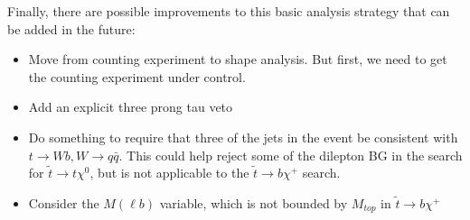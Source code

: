 Finally, there are possible improvements to this basic analysis strategy that can be added in the future:
\begin{itemize}
\item Move from counting experiment to shape analysis.  But first, we need to get the counting
experiment under control.
\item Add an explicit three prong tau veto
\item Do something to require that three of the jets in the event be consistent with $t \to Wb, W \to q\bar{q}$.
This could help reject some of the dilepton BG in the search for $\widetilde{t} \to t \chi^0$, 
but is not applicable to the $\widetilde{t} \to b \chi^+$ search.
\item Consider the $M(\ell b)$ variable, which is not bounded by $M_{top}$ in $\widetilde{t} \to b \chi^+$
\end{itemize}
